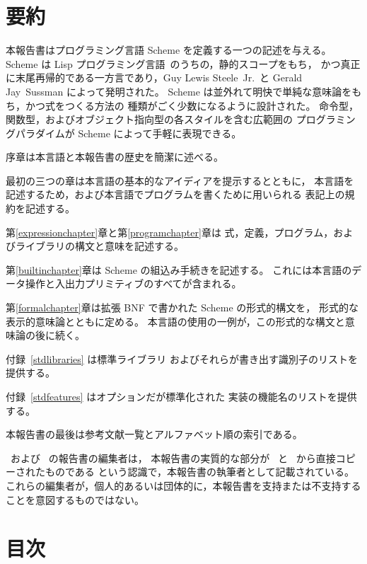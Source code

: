 \clearpage

\chapter*{要約}

本報告書はプログラミング言語 Scheme を定義する一つの記述を与える。
Scheme は Lisp プログラミング言語~\cite{McCarthy}のうちの，静的スコープをもち，
かつ真正に末尾再帰的である一方言であり，Guy Lewis Steele~Jr.\ と Gerald
Jay~Sussman によって発明された。
Scheme は並外れて明快で単純な意味論をもち，かつ式をつくる方法の
種類がごく少数になるように設計された。
命令型，関数型，およびオブジェクト指向型の各スタイルを含む広範囲の
プログラミングパラダイムが Scheme によって手軽に表現できる。

\vest 序章は本言語と本報告書の歴史を簡潔に述べる。

\vest 最初の三つの章は本言語の基本的なアイディアを提示するとともに，
本言語を記述するため，および本言語でプログラムを書くために用いられる
表記上の規約を記述する。

\vest 第\ref{expressionchapter}章と第\ref{programchapter}章は
式，定義，プログラム，およびライブラリの構文と意味を記述する。

\vest 第\ref{builtinchapter}章は Scheme の組込み手続きを記述する。
これには本言語のデータ操作と入出力プリミティブのすべてが含まれる。

\vest 第\ref{formalchapter}章は拡張 BNF で書かれた Scheme の形式的構文を，
形式的な表示的意味論とともに定める。
本言語の使用の一例が，この形式的な構文と意味論の後に続く。

\vest 付録~\ref{stdlibraries} は標準ライブラリ
およびそれらが書き出す識別子のリストを提供する。

\vest 付録~\ref{stdfeatures} はオプションだが標準化された
実装の機能名のリストを提供する。


\vest 本報告書の最後は参考文献一覧とアルファベット順の索引である。

\begin{note}
\rfivers\ および \rsixrs\ の報告書の編集者は，
本報告書の実質的な部分が \rfivers\ と \rsixrs\ から直接コピーされたものである
という認識で，本報告書の執筆者として記載されている。
これらの編集者が，個人的あるいは団体的に，本報告書を支持または不支持することを意図するものではない。
\end{note}


\vfill
\eject

\chapter*{目次}
\addvspace{3.5pt}                  %
\renewcommand{\tocshrink}{-3.5pt}  %
{\footnotesize
\tableofcontents
}

\vfill
\eject
